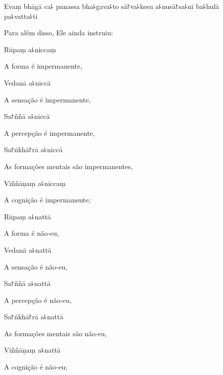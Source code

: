 Evaṃ bhāgā ca꜕ panassa bha꜕gava꜕to sā꜓va꜕kesu a꜕nusā꜓sa꜕nī ba꜕hulā pa꜕vatta꜕ti

\begin{english}
  Para além disso, Ele ainda instruiu:
\end{english}


Rūpaṃ a꜕niccaṃ

\begin{english}
  A forma é impermanente,
\end{english}

Vedanā a꜕niccā

\begin{english}
  A sensação é impermanente,
\end{english}

Sa꜓ññā a꜕niccā

\begin{english}
  A percepção é impermanente,
\end{english}

Sa꜓ṅkhā꜓rā a꜕niccā

\begin{english}
  As formações mentais são impermanentes,
\end{english}

Viññāṇaṃ a꜕niccaṃ

\begin{english}
  A cognição é impermanente;
\end{english}

Rūpaṃ a꜕nattā

\begin{english}
  A forma é não-eu,
\end{english}

Vedanā a꜕nattā

\begin{english}
  A sensação é não-eu,
\end{english}

Sa꜓ññā a꜕nattā

\begin{english}
  A percepção é não-eu,
\end{english}

Sa꜓ṅkhā꜓rā a꜕nattā

\begin{english}
  As formações mentais são não-eu,
\end{english}

Viññāṇaṃ a꜕nattā

\begin{english}
  A cognição é não-eu;
\end{english}


